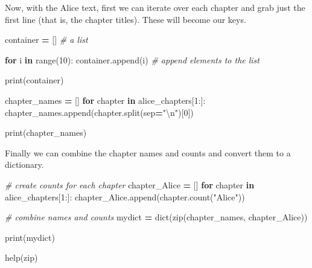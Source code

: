 \documentclass[]{book}
\newenvironment{Shaded}{\begin{snugshade}}{\end{snugshade}}
\newcommand{\BuiltInTok}[1]{#1}
\newcommand{\CharTok}[1]{\textcolor[rgb]{0.31,0.60,0.02}{#1}}
\newcommand{\CommentTok}[1]{\textcolor[rgb]{0.56,0.35,0.01}{\textit{#1}}}
\newcommand{\ControlFlowTok}[1]{\textcolor[rgb]{0.13,0.29,0.53}{\textbf{#1}}}
\newcommand{\DecValTok}[1]{\textcolor[rgb]{0.00,0.00,0.81}{#1}}
\newcommand{\KeywordTok}[1]{\textcolor[rgb]{0.13,0.29,0.53}{\textbf{#1}}}
\newcommand{\NormalTok}[1]{#1}
\newcommand{\OperatorTok}[1]{\textcolor[rgb]{0.81,0.36,0.00}{\textbf{#1}}}
\newcommand{\StringTok}[1]{\textcolor[rgb]{0.31,0.60,0.02}{#1}}
\begin{document}
Now, with the Alice text, first we can iterate over each chapter and grab just the first line (that is, the chapter titles). These will become our keys.

\begin{Shaded}
\begin{Highlighting}[]
\NormalTok{container }\OperatorTok{=}\NormalTok{ [] }\CommentTok{# a list}

\ControlFlowTok{for}\NormalTok{ i }\KeywordTok{in} \BuiltInTok{range}\NormalTok{(}\DecValTok{10}\NormalTok{):}
\NormalTok{    container.append(i) }\CommentTok{# append elements to the list}

\BuiltInTok{print}\NormalTok{(container)    }
\end{Highlighting}
\end{Shaded}

\begin{Shaded}
\begin{Highlighting}[]
\NormalTok{chapter_names }\OperatorTok{=}\NormalTok{ []}
\ControlFlowTok{for}\NormalTok{ chapter }\KeywordTok{in}\NormalTok{ alice_chapters[}\DecValTok{1}\NormalTok{:]:}
\NormalTok{    chapter_names.append(chapter.split(sep}\OperatorTok{=}\StringTok{"}\CharTok{\textbackslash{}n}\StringTok{"}\NormalTok{)[}\DecValTok{0}\NormalTok{])}

\BuiltInTok{print}\NormalTok{(chapter_names)}
\end{Highlighting}
\end{Shaded}

Finally we can combine the chapter names and counts and convert them to a dictionary.

\begin{Shaded}
\begin{Highlighting}[]
\CommentTok{# create counts for each chapter}
\NormalTok{chapter_Alice }\OperatorTok{=}\NormalTok{ []}
\ControlFlowTok{for}\NormalTok{ chapter }\KeywordTok{in}\NormalTok{ alice_chapters[}\DecValTok{1}\NormalTok{:]:}
\NormalTok{    chapter_Alice.append(chapter.count(}\StringTok{"Alice"}\NormalTok{))}

\CommentTok{# combine names and counts}
\NormalTok{mydict }\OperatorTok{=} \BuiltInTok{dict}\NormalTok{(}\BuiltInTok{zip}\NormalTok{(chapter_names, }
\NormalTok{                  chapter_Alice))}

\BuiltInTok{print}\NormalTok{(mydict)}

\BuiltInTok{help}\NormalTok{(}\BuiltInTok{zip}\NormalTok{)         }
\end{Highlighting}
\end{Shaded}
\end{document}
